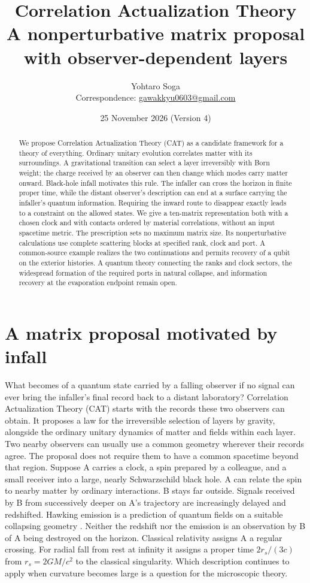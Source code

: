 \documentclass[11pt,a4paper]{article}
\title{\textbf{Correlation Actualization Theory}\\[3pt]\large A nonperturbative matrix proposal with observer-dependent layers}
\author{Yohtaro Soga\\[-1pt]\small Correspondence: \href{mailto:gawakkyu0603@gmail.com}{gawakkyu0603@gmail.com}}
\date{25 November 2026 \quad(Version 4)}
\begin{document}
\maketitle
\begin{abstract}
We propose Correlation Actualization Theory (CAT) as a candidate framework for a theory of everything. Ordinary unitary evolution correlates matter with its surroundings. A gravitational transition can select a layer irreversibly with Born weight; the charge received by an observer can then change which modes carry matter onward. Black-hole infall motivates this rule. The infaller can cross the horizon in finite proper time, while the distant observer's description can end at a surface carrying the infaller's quantum information. Requiring the inward route to disappear exactly leads to a constraint on the allowed states. We give a ten-matrix representation both with a chosen clock and with contacts ordered by material correlations, without an input spacetime metric. The prescription sets no maximum matrix size. Its nonperturbative calculations use complete scattering blocks at specified rank, clock and port. A common-source example realizes the two continuations and permits recovery of a qubit on the exterior histories. A quantum theory connecting the ranks and clock sectors, the widespread formation of the required ports in natural collapse, and information recovery at the evaporation endpoint remain open.
\end{abstract}

\section{A matrix proposal motivated by infall}\label{sec:motivation}
What becomes of a quantum state carried by a falling observer if no signal can ever bring the infaller's final record back to a distant laboratory? Correlation Actualization Theory (CAT) starts with the records these two observers can obtain. It proposes a law for the irreversible selection of layers by gravity, alongside the ordinary unitary dynamics of matter and fields within each layer. Two nearby observers can usually use a common geometry wherever their records agree. The proposal does not require them to have a common spacetime beyond that region.
Suppose A carries a clock, a spin prepared by a colleague, and a small receiver into a large, nearly Schwarzschild black hole. A can relate the spin to nearby matter by ordinary interactions. B stays far outside. Signals received by B from successively deeper on A's trajectory are increasingly delayed and redshifted. Hawking emission is a prediction of quantum fields on a suitable collapsing geometry \cite{hawking,page}. Neither the redshift nor the emission is an observation by B of A being destroyed on the horizon. Classical relativity assigns A a regular crossing. For radial fall from rest at infinity it assigns a proper time \(2r_s/(3c)\) from \(r_s=2GM/c^2\) to the classical singularity. Which description continues to apply when curvature becomes large is a question for the microscopic theory.
\end{document}
